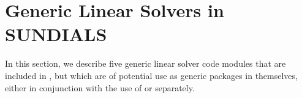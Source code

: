 \chapter{Generic Linear Solvers in SUNDIALS}\label{s:gen_linsolv}
In this section, we describe five generic linear solver code modules that 
are included in {\ida}, but which are of potential use as generic packages in
themselves, either in conjunction with the use of {\ida} or separately.


